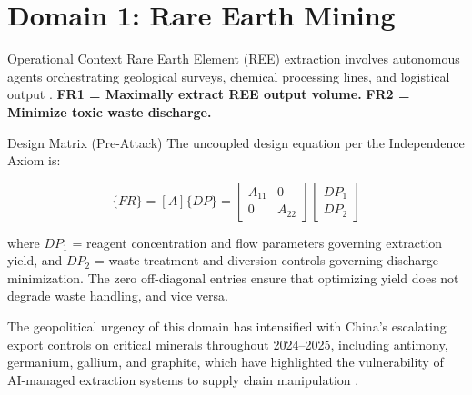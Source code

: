 \documentclass[
  ignorenonframetext,
]{beamer}
\author{\texorpdfstring{}{}}
\date{}
\begin{document}
\section{Domain 1: Rare Earth Mining}\label{sec:domain_rare_earth}

\begin{frame}[allowframebreaks]{Operational Context}
\protect{}\label{operational-context}
Rare Earth Element (REE) extraction involves autonomous agents
orchestrating geological surveys, chemical processing lines, and
logistical output \cite{mancheri2019critical, balaram2019rare}.
\textbf{FR1 = Maximally extract REE output volume.} \textbf{FR2 =
Minimize toxic waste discharge.}

\begin{block}{Design Matrix (Pre-Attack)}
\protect{}\label{design-matrix-pre-attack}
The uncoupled design equation per the Independence Axiom
\cite{suh2001axiomatic} is:

\begin{equation}
\{FR\} = [A]\{DP\} = \begin{bmatrix} A_{11} & 0 \\ 0 & A_{22} \end{bmatrix} \begin{bmatrix} DP_1 \\ DP_2 \end{bmatrix}
\label{eq:rare_earth_baseline}
\end{equation}

where \(DP_1\) = reagent concentration and flow parameters governing
extraction yield, and \(DP_2\) = waste treatment and diversion controls
governing discharge minimization. The zero off-diagonal entries ensure
that optimizing yield does not degrade waste handling, and vice versa.

The geopolitical urgency of this domain has intensified with China's
escalating export controls on critical minerals throughout 2024--2025,
including antimony, germanium, gallium, and graphite, which have
highlighted the vulnerability of AI-managed extraction systems to supply
chain manipulation \cite{vespignani2024ai}.
\end{block}
\end{frame}
\end{document}
